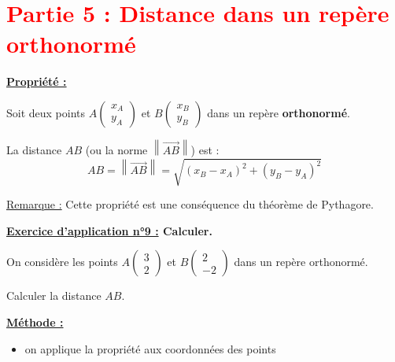 \documentclass[12pt]{article}
\newcommand*{\norme}[1]{\left\lVert\overrightarrow{#1}\right\rVert}
\newcommand*{\Coord}[2]{%
  \ensuremath{
    \begin{pmatrix} 
      #1\\ 
      #2 
    \end{pmatrix}}}
\begin{document}
\vspace{10pt}
\newpage

\section*{\textcolor{red}{Partie 5 : Distance dans un repère orthonormé}}

\vspace{5pt}

\begin{mdframed}[
    linewidth=1pt,
    roundcorner=5pt,
    linecolor=Red,
    innertopmargin=10pt,
    innerbottommargin=10pt
]
{\color{Red}\textbf{\underline{Propriété :}}}

\vspace{5pt}
Soit deux points $A\Coord{x_A}{y_A}$ et $B\Coord{x_B}{y_B}$ dans un 
repère \textbf{orthonormé}.

\vspace{5pt}
La distance $AB$ (ou la norme $\norme{AB}$) est :
\[
AB = \norme{AB} = \sqrt{(x_B - x_A)^2 + (y_B-y_A)^2}
\]
\end{mdframed}

\underline{Remarque :} Cette propriété est une conséquence 
du théorème de Pythagore.

\vspace{5pt}

\begin{mdframed}[
    linewidth=1pt,
    roundcorner=5pt,
    linecolor=RoyalBlue,
    innertopmargin=10pt,
    innerbottommargin=10pt
]
{\color{RoyalBlue}\textbf{\underline{Exercice d'application n°9 :} 
Calculer.}}
\vspace{5pt}

On considère les points $A\Coord{3}{2}$ et $B\Coord{2}{-2}$ dans un repère orthonormé.

\vspace{5pt}
Calculer la distance $AB$.

\begin{mdframed}[
    linewidth=1pt,
    roundcorner=5pt,
    linecolor=black,
    innertopmargin=10pt,
    innerbottommargin=10pt,
    backgroundcolor=gray!15
]
\underline{\textbf{Méthode :}}
\begin{itemize}
    \item on applique la propriété aux coordonnées des points
\end{itemize}
\end{mdframed}

\end{mdframed}
\end{document}

